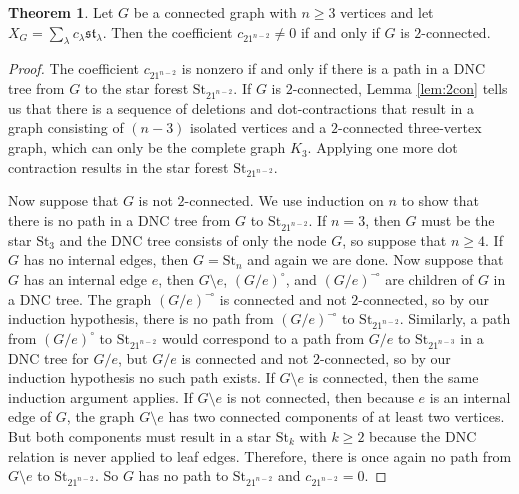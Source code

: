 \documentclass[12pt]{amsart}  %
\theoremstyle{definition}
\newtheorem{theorem}{Theorem}[section]
\theoremstyle{remark}
\numberwithin{equation}{section}
\begin{document}
\begin{theorem}\label{thm:2con}
Let $G$ be a connected graph with $n\geq 3$ vertices and let $X_G=\sum_\lambda c_\lambda\mathfrak{st}_\lambda$. Then the coefficient $c_{21^{n-2}}\neq 0$ if and only if $G$ is $2$-connected.
\end{theorem}

\begin{proof}
The coefficient $c_{21^{n-2}}$ is nonzero if and only if there is a path in a DNC tree from $G$ to the star forest $\text{St}_{21^{n-2}}$. If $G$ is $2$-connected, Lemma \ref{lem:2con} tells us that there is a sequence of deletions and dot-contractions that result in a graph consisting of $(n-3)$ isolated vertices and a $2$-connected three-vertex graph, which can only be the complete graph $K_3$. Applying one more dot contraction results in the star forest $\text{St}_{21^{n-2}}$.

Now suppose that $G$ is not $2$-connected. We use induction on $n$ to show that there is no path in a DNC tree from $G$ to $\text{St}_{21^{n-2}}$. If $n=3$, then $G$ must be the star $\text{St}_3$ and the DNC tree consists of only the node $G$, so suppose that $n\geq 4$. If $G$ has no internal edges, then $G=\text{St}_n$ and again we are done. Now suppose that $G$ has an internal edge $e$, then $G\setminus e$, $(G/e)^\circ$, and $(G/e)^\multimap$ are children of $G$ in a DNC tree. The graph $(G/e)^\multimap$ is connected and not $2$-connected, so by our induction hypothesis, there is no path from $(G/e)^\multimap$ to $\text{St}_{21^{n-2}}$. Similarly, a path from $(G/e)^\circ$ to $\text{St}_{21^{n-2}}$ would correspond to a path from $G/e$ to $\text{St}_{21^{n-3}}$ in a DNC tree for $G/e$, but $G/e$ is connected and not $2$-connected, so by our induction hypothesis no such path exists. If $G\setminus e$ is connected, then the same induction argument applies. If $G\setminus e$ is not connected, then because $e$ is an internal edge of $G$, the graph $G\setminus e$ has two connected components of at least two vertices. But both components must result in a star $\text{St}_k$ with $k\geq 2$ because the DNC relation is never applied to leaf edges. Therefore, there is once again no path from $G\setminus e$ to $\text{St}_{21^{n-2}}$. So $G$ has no path to $\text{St}_{21^{n-2}}$ and $c_{21^{n-2}}=0$.
\end{proof}
\end{document}
